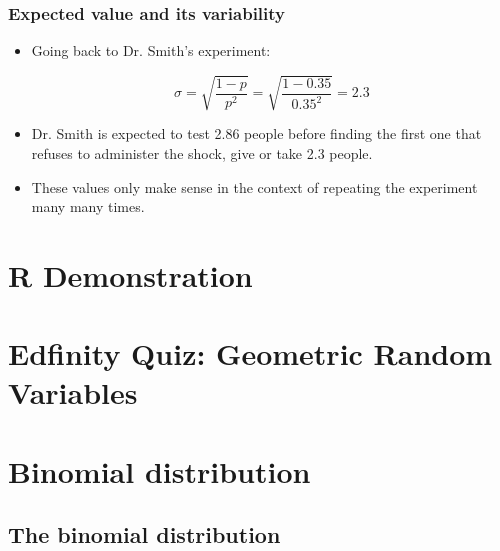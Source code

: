 \documentclass[11pt,containsverbatim,handout]{beamer}
\begin{document}

\begin{frame}
\frametitle{Expected value and its variability}


\pause

\begin{itemize}

\item Going back to Dr. Smith's experiment:

\[ \sigma = \sqrt{\frac{1-p}{p^2}} = \sqrt{\frac{1-0.35}{0.35^2}} = 2.3 \]

\pause

\item Dr. Smith is expected to test 2.86 people before finding the first one that refuses to administer the shock, give or take 2.3 people.

\pause

\item These values only make sense in the context of repeating the experiment many many times.

\end{itemize}

\end{frame}


\section{R Demonstration}


\section{Edfinity Quiz: Geometric Random Variables}



\section{Binomial distribution}


\subsection{The binomial distribution}
\end{document}
